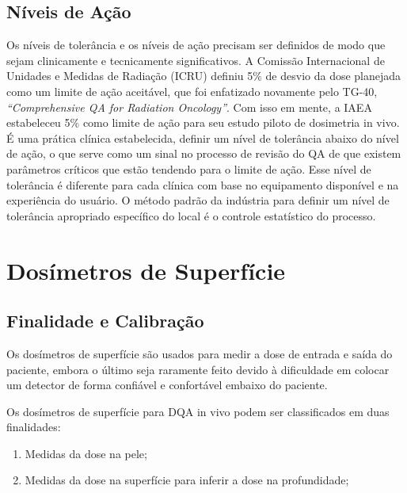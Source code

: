 \documentclass[11pt,a4paper]{article}
\begin{document}
\subsection{Níveis de Ação}

	Os níveis de tolerância e os níveis de ação precisam ser definidos de modo que sejam clinicamente e tecnicamente significativos. A Comissão Internacional de Unidades e Medidas de Radiação (ICRU) definiu 5\% de desvio da dose planejada como um limite de ação aceitável, que foi enfatizado novamente pelo TG-40, \textit{``Comprehensive QA for Radiation Oncology''}. Com isso em mente, a IAEA estabeleceu 5\% como limite de ação para seu estudo piloto de dosimetria in vivo. É uma prática clínica estabelecida, definir um nível de tolerância abaixo do nível de ação, o que serve como um sinal no processo de revisão do QA de que existem parâmetros críticos que estão tendendo para o limite de ação. Esse nível de tolerância é diferente para cada clínica com base no equipamento disponível e na experiência do usuário. O método padrão da indústria para definir um nível de tolerância apropriado específico do local é o controle estatístico do processo.

\section{Dosímetros de Superfície}

\subsection{Finalidade e Calibração}

	Os dosímetros de superfície são usados para medir a dose de entrada e saída do paciente, embora o último seja raramente feito devido à dificuldade em colocar um detector de forma confiável e confortável embaixo do paciente.

	Os dosímetros de superfície para DQA in vivo podem ser classificados em duas finalidades:

	\begin{enumerate}[label=\textcolor{CarnationPink}{\arabic*${}^\circ $}]
		\item Medidas da dose na pele;
		\item Medidas da dose na superfície para inferir a dose na profundidade;
	\end{enumerate}
\end{document}

